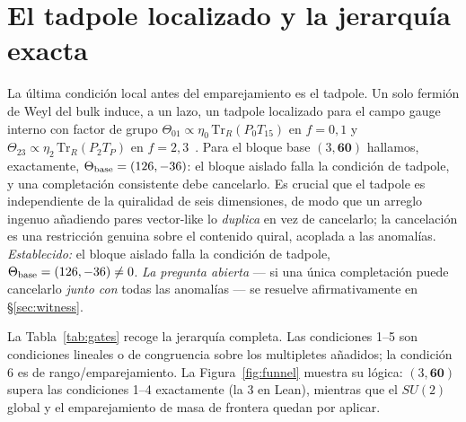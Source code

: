 \documentclass[11pt,a4paper]{article}
\newcommand{\Tr}{\mathrm{Tr}}
\begin{document}
\section{El tadpole localizado y la jerarqu\'ia exacta}\label{sec:tadpole}
La \'ultima condici\'on local antes del emparejamiento es el tadpole. Un solo fermi\'on de
Weyl del bulk induce, a un lazo, un tadpole localizado para el campo gauge interno con
factor de grupo $\Theta_{01}\propto\eta_0\,\Tr_R(P_0 T_{15})$ en $f=0,1$ y
$\Theta_{23}\propto\eta_2\,\Tr_R(P_2 T_P)$ en $f=2,3$~\cite{BiggioQ}. Para el bloque base
$(3,\mathbf{60})$ hallamos, exactamente, $\Theta_{\rm base}=(126,-36)$: el bloque aislado
falla la condici\'on de tadpole, y una completaci\'on consistente debe cancelarlo. Es
crucial que el tadpole es independiente de la quiralidad de seis dimensiones, de modo que
un arreglo ingenuo a\~nadiendo pares vector-like lo \emph{duplica} en vez de cancelarlo; la
cancelaci\'on es una restricci\'on genuina sobre el contenido quiral, acoplada a las
anomal\'ias. \emph{Establecido:} el bloque aislado falla la condici\'on de tadpole,
$\Theta_{\rm base}=(126,-36)\neq0$. \emph{La pregunta abierta} --- si una \'unica
completaci\'on puede cancelarlo \emph{junto con} todas las anomal\'ias --- se resuelve
afirmativamente en \S\ref{sec:witness}.

La Tabla~\ref{tab:gates} recoge la jerarqu\'ia completa. Las condiciones 1--5 son
condiciones lineales o de congruencia sobre los multipletes a\~nadidos; la condici\'on 6
es de rango/emparejamiento. La Figura~\ref{fig:funnel} muestra su l\'ogica: $(3,\mathbf{60})$
supera las condiciones 1--4 exactamente (la 3 en Lean), mientras que el $SU(2)$ global y
el emparejamiento de masa de frontera quedan por aplicar.
\end{document}
